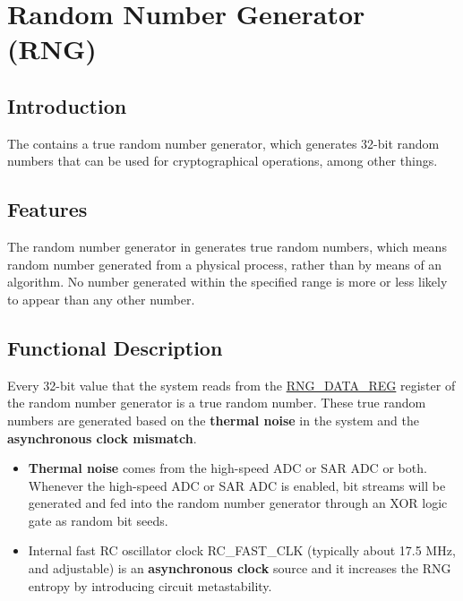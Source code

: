 \documentclass[main\_\_EN.tex]{subfiles}
\begin{document}

\ifglobal
\else
    {\let\clearpage\relax \listoftodos}
    {\let\clearpage\relax \listofdonetodos}
    \tableofcontents
\fi



\hypertarget{rng}{}
\chapter{Random Number Generator (RNG)}\label{mod:rng}

\section{Introduction}

The \chipname{} contains a true random number generator, which generates 32-bit random numbers that can be used for cryptographical operations, among other things.

\section{Features}

The random number generator in \chipname{} generates true random numbers, which means random number generated from a physical process, rather than by means of an algorithm. No number generated within the specified range is more or less likely to appear than any other number.

\section{Functional Description}\label{sec:rng-func-descr}

Every 32-bit value that the system reads from the \hyperref[regdesc:RNGDATAREG]{RNG\_DATA\_REG} register of the random number generator is a true random number. These true random numbers are generated based on the \textbf{thermal noise} in the system and the \textbf{asynchronous clock mismatch}.

\begin{itemize}
    \item \textbf{Thermal noise} comes from the high-speed ADC or SAR ADC or both. Whenever the high-speed ADC or SAR ADC is enabled, bit streams will be generated and fed into the random number generator through an XOR logic gate as random bit seeds.
    \item Internal fast RC oscillator clock RC\_FAST\_CLK (typically about 17.5 MHz, and adjustable) is an \textbf{asynchronous clock} source and it increases the RNG entropy by introducing circuit metastability.
\end{itemize}
\end{document}
